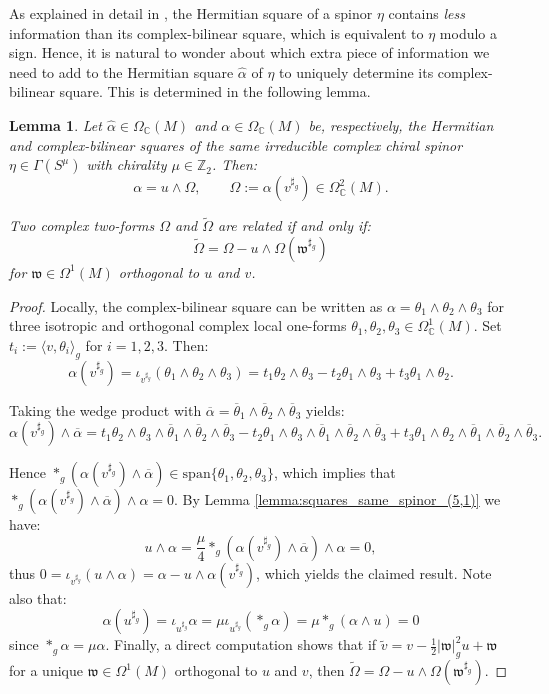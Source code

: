\documentclass[10pt,a4paper,twoside,reqno]{amsart}
\theoremstyle{plain}
\newtheorem{lemma}[thm]{Lemma}
\theoremstyle{definition}
\theoremstyle{remark}
\def\Z{\mathbb{Z}}
\def\C{\mathbb{C}}
\newcommand{\escal}[1]{\langle#1\rangle}
\begin{document}
As explained in detail in \cite{Algebraic_Complex_Square_2025}, the Hermitian square of a spinor $\eta$ contains \emph{less} information than its complex-bilinear square, which is equivalent to $\eta$ modulo a sign. Hence, it is natural to wonder about which extra piece of information we need to add to the Hermitian square $\widehat{\alpha}$ of $\eta$ to uniquely determine its complex-bilinear square. This is determined in the following lemma.

\begin{lemma}
\label{lemma:alpha=u_wedge_Omega}
Let $\widehat{\alpha}\in\Omega_\C(M)$ and $\alpha\in\Omega_\C(M)$ be, respectively, the Hermitian and complex-bilinear squares of the same irreducible complex chiral spinor $\eta\in\Gamma(S^\mu)$ with chirality $\mu\in\Z_2$. Then: $$\alpha=u\wedge\Omega,\qquad\Omega:=\alpha(v^{\sharp_g})\in\Omega_\C^2(M).$$

Two complex two-forms $\Omega$ and $\tilde{\Omega}$ are related if and only if: $$\tilde{\Omega}=\Omega-u\wedge\Omega(\mathfrak{w}^{\sharp_g})$$ for $\mathfrak{w}\in\Omega^1(M)$ orthogonal to $u$ and $v$.
\end{lemma}

\begin{proof}
Locally, the complex-bilinear square can be written as $\alpha=\theta_1\wedge\theta_2\wedge\theta_3$ for three isotropic and orthogonal complex local one-forms $\theta_1,\theta_2,\theta_3\in\Omega^1_\C(M)$. Set $t_i:=\escal{v,\theta_i}_g$ for $i=1,2,3$. Then: $$\alpha(v^{\sharp_g})=\iota_{v^{\sharp_g}}(\theta_1\wedge\theta_2\wedge\theta_3)=t_1\theta_2\wedge\theta_3-t_2\theta_1\wedge\theta_3+t_3\theta_1\wedge\theta_2.$$

Taking the wedge product with $\overline{\alpha}=\overline{\theta}_1\wedge\overline{\theta}_2\wedge\overline{\theta}_3$ yields: $$\alpha(v^{\sharp_g})\wedge\overline{\alpha}=t_1\theta_2\wedge\theta_3\wedge\overline{\theta}_1\wedge\overline{\theta}_2\wedge\overline{\theta}_3-t_2\theta_1\wedge\theta_3\wedge\overline{\theta}_1\wedge\overline{\theta}_2\wedge\overline{\theta}_3+t_3\theta_1\wedge\theta_2\wedge\overline{\theta}_1\wedge\overline{\theta}_2\wedge\overline{\theta}_3.$$

Hence $*_g(\alpha(v^{\sharp_g})\wedge\overline{\alpha})\in\mathrm{span}\{\theta_1,\theta_2,\theta_3\}$, which implies that $*_g(\alpha(v^{\sharp_g})\wedge\overline{\alpha})\wedge\alpha=0$. By Lemma \ref{lemma:squares_same_spinor_(5,1)} we have: $$u\wedge\alpha=\frac{\mu}{4}*_g(\alpha(v^{\sharp_g})\wedge\overline{\alpha})\wedge\alpha=0,$$ thus $0=\iota_{v^{\sharp_g}}(u\wedge\alpha)=\alpha-u\wedge\alpha(v^{\sharp_g})$, which yields the claimed result. Note also that: $$\alpha(u^{\sharp_g})=\iota_{u^{\sharp_g}}\alpha=\mu\iota_{u^{\sharp_g}}(*_g\alpha)=\mu*_g(\alpha\wedge u)=0$$ since $*_g\alpha=\mu\alpha$. Finally, a direct computation shows that if $\tilde{v} = v - \frac{1}{2}\vert\mathfrak{w}\vert_g^2 u + \mathfrak{w}$ for a unique $\mathfrak{w}\in\Omega^1(M)$ orthogonal to $u$ and $v$, then $\tilde{\Omega}=\Omega-u\wedge\Omega(\mathfrak{w}^{\sharp_g})$.
\end{proof}
\end{document}
